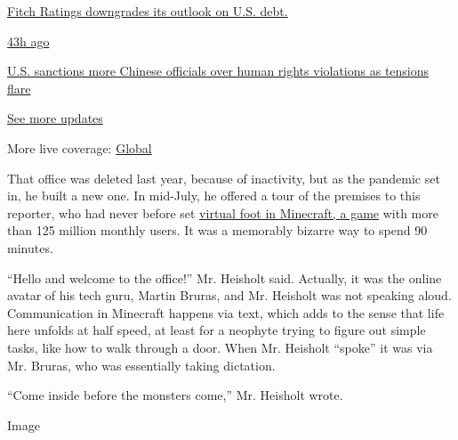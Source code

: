 \href{https://www.nytimes.com/live/2020/07/31/business/stock-market-today-coronavirus?action=click\&pgtype=Article\&state=default\&region=MAIN_CONTENT_1\&context=storylines_live_updates\#fitch-ratings-downgrades-its-outlook-on-us-debt}{Fitch
Ratings downgrades its outlook on U.S. debt.}

\href{https://www.nytimes.com/live/2020/07/31/business/stock-market-today-coronavirus?action=click\&pgtype=Article\&state=default\&region=MAIN_CONTENT_1\&context=storylines_live_updates\#us-sanctions-more-chinese-officials-over-human-rights-violations-as-tensions-flare}{43h
ago}

\href{https://www.nytimes.com/live/2020/07/31/business/stock-market-today-coronavirus?action=click\&pgtype=Article\&state=default\&region=MAIN_CONTENT_1\&context=storylines_live_updates\#us-sanctions-more-chinese-officials-over-human-rights-violations-as-tensions-flare}{U.S.
sanctions more Chinese officials over human rights violations as
tensions flare}

\href{https://www.nytimes.com/live/2020/07/31/business/stock-market-today-coronavirus?action=click\&pgtype=Article\&state=default\&region=MAIN_CONTENT_1\&context=storylines_live_updates}{See
more updates}

More live coverage:
\href{https://www.nytimes.com/2020/08/01/world/coronavirus-covid-19.html?action=click\&pgtype=Article\&state=default\&region=MAIN_CONTENT_1\&context=storylines_live_updates}{Global}

That office was deleted last year, because of inactivity, but as the
pandemic set in, he built a new one. In mid-July, he offered a tour of
the premises to this reporter, who had never before set
\href{https://www.nytimes.com/2016/04/17/magazine/the-minecraft-generation.html}{virtual
foot in Minecraft, a game} with more than 125 million monthly users. It
was a memorably bizarre way to spend 90 minutes.

``Hello and welcome to the office!'' Mr. Heisholt said. Actually, it was
the online avatar of his tech guru, Martin Bruras, and Mr. Heisholt was
not speaking aloud. Communication in Minecraft happens via text, which
adds to the sense that life here unfolds at half speed, at least for a
neophyte trying to figure out simple tasks, like how to walk through a
door. When Mr. Heisholt ``spoke'' it was via Mr. Bruras, who was
essentially taking dictation.

``Come inside before the monsters come,'' Mr. Heisholt wrote.

Image

